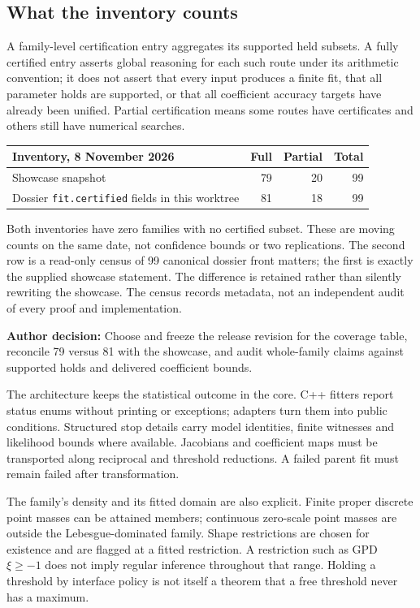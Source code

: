 \documentclass[12pt]{article}
\theoremstyle{definition}
\theoremstyle{remark}
\newcommand{\todo}[1]{\par\smallskip\noindent\textcolor{red!65!black}{\textbf{Author decision:} #1}\par\smallskip}
\newcommand{\code}[1]{\nolinkurl{#1}}
\begin{document}
\subsection{What the inventory counts}
A family-level certification entry aggregates its supported held subsets.
A fully certified entry asserts global reasoning for each such route under
its arithmetic convention; it does not assert that every input produces a
finite fit, that all parameter holds are supported, or that all coefficient
accuracy targets have already been unified. Partial certification means
some routes have certificates and others still have numerical searches.
\begin{center}
\begin{tabular}{lrrr}
\toprule
Inventory, 8 November 2026&Full&Partial&Total\\
\midrule
Showcase snapshot&79&20&99\\
Dossier \code{fit.certified} fields in this worktree&81&18&99\\
\bottomrule
\end{tabular}
\end{center}
Both inventories have zero families with no certified subset. These are
moving counts on the same date, not confidence bounds or two replications.
The second row is a read-only census of 99 canonical dossier front matters;
the first is exactly the supplied showcase statement. The difference is
retained rather than silently rewriting the showcase. The census records
metadata, not an independent audit of every proof and implementation.
\todo{Choose and freeze the release revision for the coverage table, reconcile 79 versus 81 with the showcase, and audit whole-family claims against supported holds and delivered coefficient bounds.}

The architecture keeps the statistical outcome in the core. C++ fitters
report status enums without printing or exceptions; adapters turn them
into public conditions. Structured stop details carry model identities,
finite witnesses and likelihood bounds where available. Jacobians and
coefficient maps must be transported along reciprocal and threshold
reductions. A failed parent fit must remain failed after transformation.

The family's density and its fitted domain are also explicit. Finite proper
discrete point masses can be attained members; continuous zero-scale point
masses are outside the Lebesgue-dominated family. Shape restrictions are
chosen for existence and are flagged at a fitted restriction. A restriction
such as GPD $\xi\ge-1$ does not imply regular inference throughout that
range. Holding a threshold by interface policy is not itself a theorem
that a free threshold never has a maximum.
\end{document}
